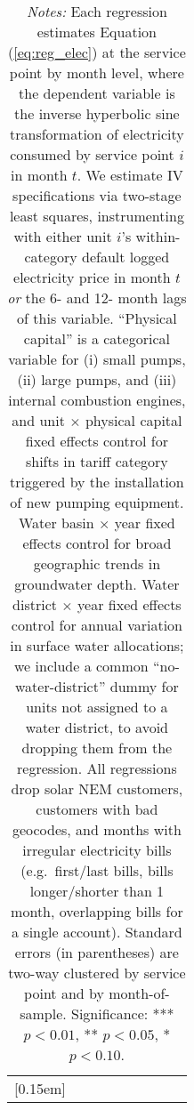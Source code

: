 \begin{table}[t!]
\begin{adjustbox}{center}
\begin{tabular}{lcccccccc}
[0.15em]
\hline
\end{tabular}
\end{adjustbox}
\captionsetup{width=\textwidth}
\caption*{\scriptsize \emph{Notes:} Each regression estimates Equation (\ref{eq:reg_elec}) at the service point by month level,
where the dependent variable is the inverse hyperbolic sine transformation of electricity consumed by service point $i$ in month $t$.
We estimate IV specifications via two-stage least squares, instrumenting with either unit $i$'s within-category default 
logged electricity price in month $t$ \emph{or} the 6- and 12- month lags of this variable.
``Physical capital'' is a categorical variable for (i) small pumps, (ii) large pumps, and (iii) internal combustion engines, and unit $\times$
physical capital fixed effects control for shifts in tariff category triggered by the installation of new pumping equipment.
Water basin $\times$ year fixed effects control for broad geographic trends in groundwater depth.
Water district $\times$ year fixed effects control for annual variation in surface water allocations; 
we include a common ``no-water-district'' dummy for units not assigned to a water district, to avoid dropping them from the regression. 
All regressions drop solar NEM customers, customers with bad geocodes, and months with irregular electricity bills
(e.g.\ first/last bills, bills longer/shorter than 1 month, overlapping bills for a single account).
Standard errors (in parentheses) are two-way clustered by service point and by month-of-sample.
Significance: *** $p < 0.01$, ** $p < 0.05$, * $p < 0.10$.
}
\end{table}
